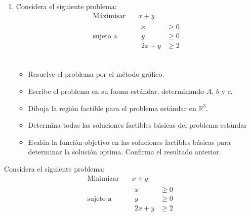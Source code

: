 \documentclass{article}
\begin{document}
\begin{enumerate}
 \item Considera el siguiente problema:
  \begin{equation*}
    \begin{aligned}
      \text{Máximisar} \quad & x+y \\
      \text{sujeto a} \quad &
      \begin{aligned}
        x & \geq 0 \\
        y & \geq 0 \\
        2x+y & \geq 2
      \end{aligned}
    \end{aligned}
  \end{equation*}
  \\
  \begin{itemize}
  \item Resuelve el problema por el método gráfico.
  \item Escribe el problema en su forma estándar, determinando $A$, $b$ y $c$.
  \item Dibuja la región factible para el problema estándar en $\mathbb{R}^3$.
  \item Determina todas las soluciones factibles básicas del problema estándar
  \item Evalúa la función objetivo en las soluciones factibles básicas para determinar la solución optima. Confirma el resultado anterior.

  \end{itemize}
\end{enumerate}


Considera el siguiente problema:
\begin{equation*}
  \begin{aligned}
    \text{Minimizar}\quad & x+y \\
    \text{sujeto a}\quad  &
    \begin{aligned}
      x & \geq 0\\
      y & \geq 0\\
      2x+y & \geq 2
    \end{aligned}
  \end{aligned}
\end{equation*}
\end{document}

